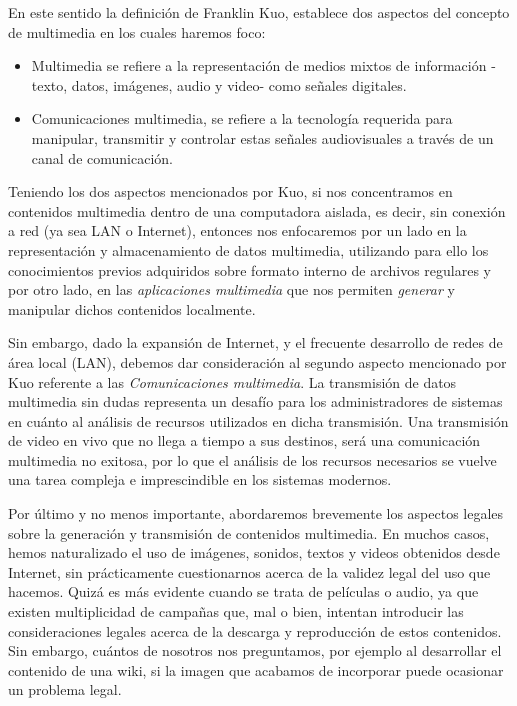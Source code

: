 \documentclass[12pt]{article}
\begin{document}
En este sentido la definición de Franklin Kuo, establece dos aspectos del
concepto de multimedia en los cuales haremos foco:

\begin{itemize}
\item Multimedia se refiere a la representación de medios mixtos de información
-texto, datos, imágenes, audio y video- como señales digitales. 
\item Comunicaciones multimedia, se refiere a la tecnología requerida para 
manipular, transmitir y controlar estas señales audiovisuales a través de un 
canal de comunicación.\cite{frankuo}
\end{itemize}


Teniendo los dos aspectos mencionados por Kuo, si nos concentramos en contenidos 
multimedia dentro de una computadora aislada, es decir, sin conexión a red (ya sea LAN o 
Internet), entonces nos enfocaremos por un lado en la representación y almacenamiento 
de datos multimedia, utilizando para ello los conocimientos previos 
adquiridos sobre formato interno de archivos regulares y por otro lado, en 
las {\it aplicaciones multimedia} que nos permiten {\it generar} y manipular 
dichos contenidos localmente. 

Sin embargo, dado la expansión de Internet, y el frecuente desarrollo 
de redes de área local (LAN), debemos dar consideración al segundo aspecto mencionado
por Kuo referente a las {\it Comunicaciones multimedia}. La transmisión 
de datos multimedia sin dudas representa un desafío para los administradores
de sistemas en cuánto al análisis de recursos utilizados en dicha transmisión.
Una transmisión de video en vivo que no llega a tiempo a sus destinos, será 
una comunicación multimedia no exitosa, por lo que el análisis de los 
recursos necesarios se vuelve una tarea compleja e imprescindible en los 
sistemas modernos. 

Por último y no menos importante, abordaremos brevemente los aspectos legales 
sobre la generación y transmisión de contenidos multimedia. En muchos casos,
hemos naturalizado el uso de imágenes, sonidos, textos y videos obtenidos 
desde Internet, sin prácticamente cuestionarnos acerca de la validez 
legal del uso que hacemos. Quizá es más evidente cuando se trata de 
películas o audio, ya que existen multiplicidad de campañas que, mal o 
bien, intentan introducir las consideraciones legales acerca de la descarga y 
reproducción de estos contenidos. Sin embargo, cuántos de nosotros nos 
preguntamos, por ejemplo al desarrollar el contenido de una wiki, si la 
imagen que acabamos de incorporar puede ocasionar un problema legal. 
\end{document}
